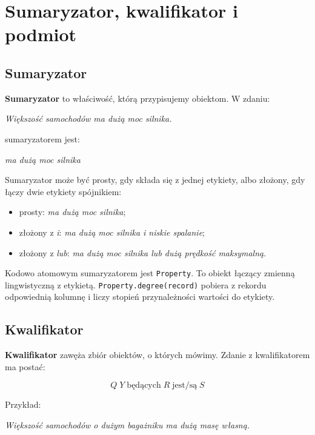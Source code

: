 \documentclass[11pt,a4paper]{article}
\newcommand{\code}[1]{\texttt{#1}}
\newcommand{\term}[1]{\textbf{#1}}
\begin{document}
\section{Sumaryzator, kwalifikator i podmiot}

\subsection{Sumaryzator}

\term{Sumaryzator} to właściwość, którą przypisujemy obiektom. W zdaniu:

\begin{center}
\emph{Większość samochodów ma dużą moc silnika.}
\end{center}

sumaryzatorem jest:

\begin{center}
\emph{ma dużą moc silnika}
\end{center}

Sumaryzator może być prosty, gdy składa się z jednej etykiety, albo złożony, gdy łączy dwie etykiety spójnikiem:

\begin{itemize}
    \item prosty: \emph{ma dużą moc silnika};
    \item złożony z \emph{i}: \emph{ma dużą moc silnika i niskie spalanie};
    \item złożony z \emph{lub}: \emph{ma dużą moc silnika lub dużą prędkość maksymalną}.
\end{itemize}

Kodowo atomowym sumaryzatorem jest \code{Property}. To obiekt łączący zmienną lingwistyczną z etykietą. \code{Property.degree(record)} pobiera z rekordu odpowiednią kolumnę i liczy stopień przynależności wartości do etykiety.

\subsection{Kwalifikator}

\term{Kwalifikator} zawęża zbiór obiektów, o których mówimy. Zdanie z kwalifikatorem ma postać:

\[
Q\;Y\;\text{będących}\;R\;\text{jest/są}\;S
\]

Przykład:

\begin{center}
\emph{Większość samochodów o dużym bagażniku ma dużą masę własną.}
\end{center}
\end{document}
